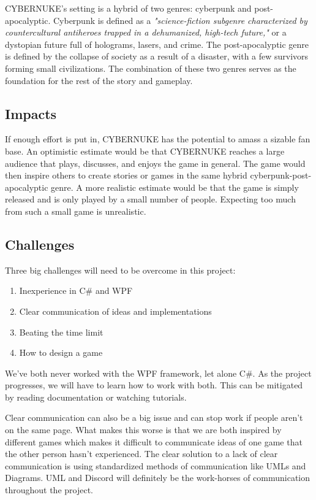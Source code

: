 \documentclass[10pt,conference,onecolumn,compsoc]{IEEEtran}
\begin{document}
CYBERNUKE's setting is a hybrid of two genres: cyberpunk and post-apocalyptic.
Cyberpunk is defined as a \emph{"science-fiction subgenre characterized by countercultural antiheroes trapped in a dehumanized, high-tech future,"}\cite{IEEEhowto:cyberpunk} or a dystopian future full of holograms, lasers, and crime. The post-apocalyptic genre is defined by the collapse of society as a result of a disaster, with a few survivors forming small civilizations. The combination of these two genres serves as the foundation for the rest of the story and gameplay. 

\subsection{Impacts}
If enough effort is put in, CYBERNUKE has the potential to amass a sizable fan base. An optimistic estimate would be that CYBERNUKE reaches a large audience that plays, discusses, and enjoys the game in general. The game would then inspire others to create stories or games in the same hybrid cyberpunk-post-apocalyptic genre. A more realistic estimate would be that the game is simply released and is only played by a small number of people. Expecting too much from such a small game is unrealistic. 

\subsection{Challenges}
Three big challenges will need to be overcome in this project:
\begin{enumerate}
\item Inexperience in C\# and WPF
\item Clear communication of ideas and implementations
\item Beating the time limit
\item How to design a game
\end{enumerate}
We've both never worked with the WPF framework, let alone C\#. As the project progresses, we will have to learn how to work with both. This can be mitigated by reading documentation or watching tutorials.

Clear communication can also be a big issue and can stop work if people aren't on the same page. What makes this worse is that we are both inspired by different games which makes it difficult to communicate ideas of one game that the other person hasn't experienced. The clear solution to a lack of clear communication is using standardized methods of communication like UMLs and Diagrams. UML and Discord will definitely be the work-horses of communication throughout the project.
\end{document}
